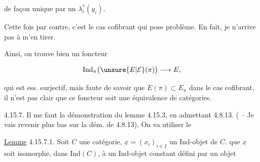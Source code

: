 %
%
de façon  unique par un $\lambda_i^*(y_i)$.

Cette fois par contre, c'est le cas cofibrant qui pose problème. En fait, je n'arrive pas à m'en tirer.

Ainsi, on trouve bien un foncteur

\[ \mathrm{Ind}_\pi\bigl(\unsure{E|\mathcal E}(\pi)\bigr)\longrightarrow E, \]

qui est ess. surjectif, mais faute de savoir que $E(\pi)\subset E_\pi$ dans le cas cofibrant, il n'est pas clair que ce foncteur soit une équivalence de catégories.

4.15.7. Il me faut  la démonstration du lemme 4.15.3, en admettant 4.8.13. ( -- Je vais revenir plus bas sur la dém. de 4.8.13), On va utiliser le

\uline{Lemme} 4.15.7.1. Soit $C$ une catégorie, $\underline{x}=(x_i)_{i\in I}$ un Ind-objet de $C$.  que  $\underline{x}$ soit  isomorphe, dans $\mathrm{Ind}(C)$, à un  Ind-objet constant  défini par un objet 
